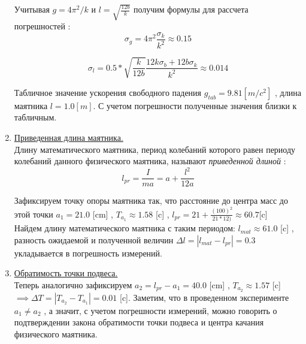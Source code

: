 \documentclass[12pt]{article}
\begin{document}
\begin{enumerate}
        Учитывая $g = 4\pi^2 / k$ и $l = \sqrt{\frac{12b}{k}}$ получим формулы для рассчета погрешностей :
        \begin{equation}
            \sigma_{g} = 4 \pi^2 \frac{\sigma_{k}} {k^2} \approx 0.15
        \end{equation}

        \begin{equation}
            \sigma_{l} =  0.5 * \sqrt{\frac{k}{12 b}} \frac{12k \sigma_{b} + 12b \sigma_{k}} {k^2} \approx 0.014
        \end{equation}

        Табличное значение ускорения свободного падения $g_{tab} = 9.81 [m / c^2] $ , длина маятника $l = 1.0 [m]$.
        С учетом погрешности полученные значения близки к табличным.

        \item \underline{Приведенная длина маятника.} \\
            Длину математического маятника, период колебаний которого равен периоду колебаний данного физического маятника, называют {\itshape{приведенной длиной} }:
            \begin{equation}
                l_{pr} = \frac{I}{ma} = a + \frac{l^2}{12a} 
            \end{equation}

        Зафиксируем точку опоры маятника так, что расстояние до центра масс до этой точки $a_1 = 21.0$ [cm] , $T_{a_{1}} \approx 1.58$ [c] , 
        $l_{pr} = 21 + \frac{(100)^2}{21 * 12)} \approx 60.7$[c] \\
        Найдем длину математического маятника с таким периодом: $l_{mat} \approx 61.0$ [c] , разность ожидаемой и полученной величин $\Delta l = |l_{mat} - l_{pr}| = 0.3$ укладывается в погрешность измерений.

        \item \underline{Обратимость точки подвеса.} \\
        Теперь аналогично зафиксируем $a_2 = l_{pr} - a_1 = 40.0$ [cm] , $T_{a_{2}} \approx 1.57$ [c] 
        $\implies \Delta T = |T_{a_{2}} - T_{a_{1}}| = 0.01$ [c].  
        Заметим, что в проведенном эксперименте $a_1 \neq a_2$ , а значит, 
        с учетом погрешности измерений, можно говорить о подтверждении закона обратимости точки подвеса и центра качания физического маятника.

    \end{enumerate} 
\end{document}
